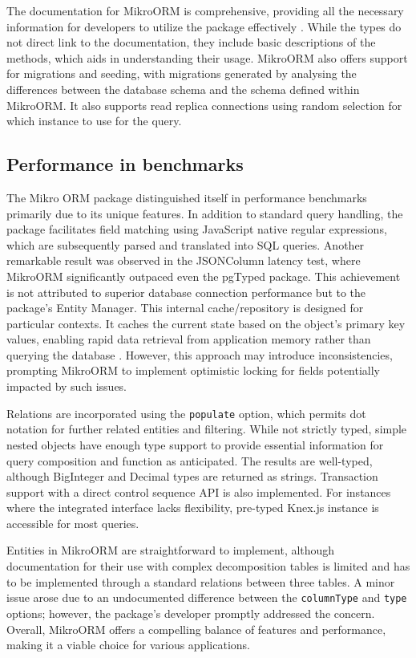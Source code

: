 The documentation for MikroORM is comprehensive, providing all the necessary
information for developers to utilize the package effectively
\cite{mikroORMDocs}. While the types do not direct link to the documentation,
they include basic descriptions of the methods, which aids in understanding
their usage. MikroORM also offers support for migrations and seeding, with
migrations generated by analysing the differences between the database schema
and the schema defined within MikroORM. It also supports read replica
connections using random selection for which instance to use for the query.

\subsection*{Performance in benchmarks}

The Mikro ORM package distinguished itself in performance benchmarks primarily
due to its unique features. In addition to standard query handling, the package
facilitates field matching using JavaScript native regular expressions, which
are subsequently parsed and translated into SQL queries. Another remarkable
result was observed in the JSONColumn latency test, where MikroORM significantly
outpaced even the pgTyped package. This achievement is not attributed to
superior database connection performance but to the package's Entity Manager.
This internal cache/repository is designed for particular contexts. It caches
the current state based on the object's primary key values, enabling rapid data
retrieval from application memory rather than querying the database
\cite{mikroORM-EM}. However, this approach may introduce inconsistencies,
prompting MikroORM to implement optimistic locking for fields potentially
impacted by such issues.

Relations are incorporated using the \texttt{populate} option, which permits dot
notation for further related entities and filtering. While not strictly typed,
simple nested objects have enough type support to provide essential information
for query composition and function as anticipated. The results are well-typed,
although BigInteger and Decimal types are returned as strings. Transaction
support with a direct control sequence API is also implemented. For instances
where the integrated interface lacks flexibility, pre-typed Knex.js instance is
accessible for most queries.

Entities in MikroORM are straightforward to implement, although documentation
for their use with complex decomposition tables is limited and has to be
implemented through a standard relations between three tables. A minor issue
arose due to an undocumented difference between the \texttt{columnType} and
\texttt{type} options; however, the package's developer promptly addressed the
concern. Overall, MikroORM offers a compelling balance of features and
performance, making it a viable choice for various applications.
